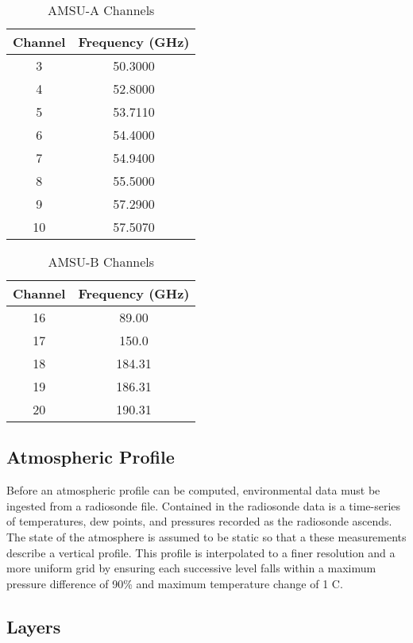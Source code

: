 \documentclass[twocol]{ametsoc}
\begin{document}
\begin{table}
	\centering
	\caption{AMSU-A Channels}
	\begin{tabular}{cc}
		\toprule
		Channel	& Frequency (GHz)\\
		\midrule
	    3 & 50.3000 \\
	    4 & 52.8000 \\
	    5 & 53.7110 \\
	    6 & 54.4000 \\
	    7 & 54.9400 \\
	    8 & 55.5000 \\
	    9 & 57.2900 \\
	    10 & 57.5070 \\
	    \bottomrule
	\end{tabular}
	\label{tab:amsua}
\end{table}

\begin{table}
	\centering
	\caption{AMSU-B Channels}
	\begin{tabular}{cc}
		\toprule
		Channel	& Frequency (GHz)\\
		\midrule
		16 & 89.00 \\
		17 & 150.0 \\
		18 & 184.31 \\
		19 & 186.31 \\
		20 & 190.31 \\
	    \bottomrule
	\end{tabular}
	\label{tab:amsub}
\end{table}

\subsection{Atmospheric Profile}

Before an atmospheric profile can be computed, environmental data must be ingested from a radiosonde file.
Contained in the radiosonde data is a time-series of temperatures, dew points, and pressures recorded as the radiosonde ascends. The state of the atmosphere is assumed to be static so that a these measurements describe a vertical profile. This profile is interpolated to a finer resolution and a more uniform grid by ensuring each successive level falls within a maximum pressure difference of 90\% and maximum temperature change of 1 \degree{}C.

\subsection{Layers}
\end{document}
